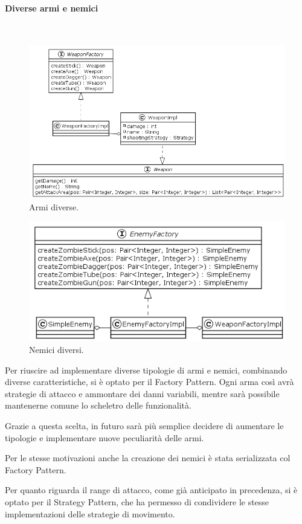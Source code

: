 \documentclass[a4paper,titlepage,12pt]{article}
\begin{document}
\paragraph{Diverse armi e nemici}
\par \noindent \\
\begin{figure}[H]
    \centering
    \includegraphics[scale=0.55]{img/uml/Weapon.png}
    \caption{Armi diverse.}
    \label{fig: Weapon}
\end{figure}
\begin{figure}[H]
    \centering
    \includegraphics[scale=0.7]{img/uml/Enemy.png}
    \caption{Nemici diversi.}
    \label{fig: Enemy}
\end{figure}
\par \noindent Per riuscire ad implementare diverse tipologie di armi e nemici, combinando diverse caratteristiche, si è optato per il Factory Pattern. Ogni arma così avrà strategie di attacco e ammontare dei danni variabili, mentre sarà possibile mantenerne comune lo scheletro delle funzionalità.
\par \noindent Grazie a questa scelta, in futuro sarà più semplice decidere di aumentare le tipologie e implementare nuove peculiarità delle armi.
\par \noindent Per le stesse motivazioni anche la creazione dei nemici è stata serializzata col Factory Pattern.
\par \noindent Per quanto riguarda il range di attacco, come già anticipato in precedenza, si è optato per il Strategy Pattern, che ha permesso di condividere le stesse implementazioni delle strategie di movimento. %
\newpage
\end{document}
